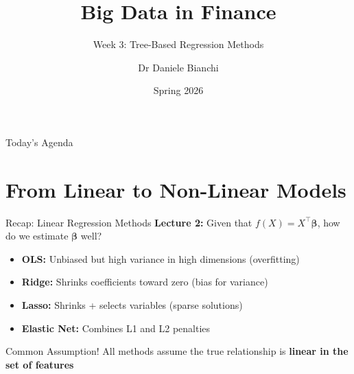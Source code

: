 \documentclass[10pt]{beamer}
\title{Big Data in Finance}
\subtitle{Week 3: Tree-Based Regression Methods}
\author{Dr Daniele Bianchi}
\date{Spring 2026}
\newcommand{\highlight}[1]{\textcolor{AccentOrange}{\textbf{#1}}}
\begin{document}
\AtBeginSection[]{
  \begin{frame}[plain]
    \vfill
    \begin{center}
      {\Large\color{ThemeBlue}\insertsection}
    \end{center}
    \vfill
  \end{frame}
}


\begin{frame}[plain]
  \titlepage
\end{frame}

\begin{frame}{Today's Agenda}
  \tableofcontents
\end{frame}

\section{From Linear to Non-Linear Models}

\begin{frame}{Recap: Linear Regression Methods}
  \textbf{Lecture 2:} Given that $f(X) = X^\top\boldsymbol{\beta}$, how do we estimate $\boldsymbol{\beta}$ well?

  \vspace{1em}
  \begin{itemize}
    \item \textbf{OLS:} Unbiased but high variance in high dimensions (overfitting)
    \vspace{0.5em}
    \item \textbf{Ridge:} Shrinks coefficients toward zero (bias for variance)
    \vspace{0.5em}
    \item \textbf{Lasso:} Shrinks + selects variables (sparse solutions)
    \vspace{0.5em}
    \item \textbf{Elastic Net:} Combines L1 and L2 penalties
  \end{itemize}

  \vspace{1em}
  \begin{block}{Common Assumption!}
    All methods assume the true relationship is \highlight{linear in the set of features}
  \end{block}
\end{frame}
\end{document}
